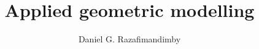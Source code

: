 \documentclass[a4paper,10pt]{article}
\title{Applied geometric modelling}
\author{Daniel G. Razafimandimby}
\begin{document}
\maketitle

\begin{abstract}

\end{abstract}

\section{}
\end{document}
